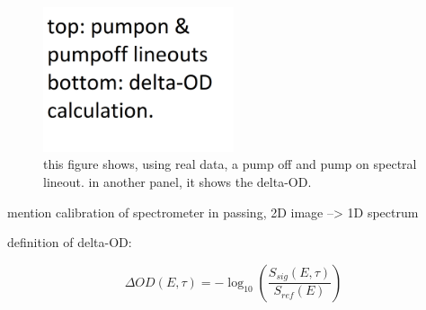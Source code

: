 \begin{figure}
	\centering
	\includegraphics[width=0.5\textwidth]{figures/chap3/PumpOn_vs_PumpOff.png}
	\caption{this figure shows, using real data, a pump off and pump on spectral lineout. in another panel, it shows the delta-OD.}
	\label{fig:PumpOn_vs_PumpOff}
\end{figure}


mention calibration of spectrometer in passing, 2D image --> 1D spectrum

definition of delta-OD:

\begin{equation}
\Delta OD(E,\tau) = -\log_{10} \left(\frac{S_{sig}(E,\tau)}{S_{ref}(E)} \right)
\label{eqn:delta-OD}
\end{equation}
